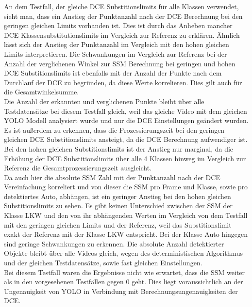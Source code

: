 {{		An dem Testfall, der gleiche DCE Substitionslimits für alle Klassen verwendet, sieht man, dass ein Anstieg der Punktanzahl nach der DCE Berechnung bei den geringen gleichen Limits vorhanden ist. Dies ist durch das Anheben mancher DCE Klassensubstitutionslimits im Vergleich zur Referenz zu erklären. Ähnlich lässt sich der Anstieg der Punktanzahl im Vergleich mit den hohen gleichen Limits interpretieren. Die Schwankungen im Vergleich zur Referenz bei der Anzahl der verglichenen Winkel zur SSM Berechnung bei geringen und hohen DCE Substitionslimits ist ebenfalls mit der Anzahl der Punkte nach dem Durchlauf der DCE zu begründen, da diese Werte korrelieren. Dies gilt auch für die Gesamtwinkelsumme. \\
		Die Anzahl der erkannten und verglichenen Punkte bleibt über alle Testdatensätze bei diesem Testfall gleich, weil das gleiche Video mit dem gleichen YOLO Modell analysiert wurde und nur die DCE Einstellungen geändert wurden. Es ist außerdem zu erkennen, dass die Prozessierungszeit bei den geringen gleichen DCE Substitionslimits ansteigt, da die DCE Berechnung aufwendiger ist. Bei den hohen gleichen Substitionslimits ist der Anstieg nur marginal, da die Erhöhung der DCE Substitionslimits über alle 4 Klassen hinweg im Vergleich zur Referenz die Gesamtprozessierungszeit ausgleicht. \\
		Da auch hier die absolute SSM Zahl mit der Punktanzahl nach der DCE Vereinfachung korreliert und von dieser die SSM pro Frame und Klasse, sowie pro detektiertes Auto, abhängen, ist ein geringer Anstieg bei den hohen gleichen Substitionslimits zu sehen. Es gibt keinen Unterschied zwischen der SSM der Klasse LKW und den von ihr abhängenden Werten im Vergleich von dem Testfall mit den geringen gleichen Limits und der Referenz, weil das Substitionslimit exakt der Referenz mit der Klasse LKW entspricht. Bei der Klasse Auto hingegen sind geringe Schwankungen zu erkennen. Die absolute Anzahl detektierter Objekte bleibt über alle Videos gleich, wegen des deterministischen Algorithmus und der gleichen Testdatensätze, sowie fast gleichen Einstellungen. \\
		Bei diesem Testfall waren die Ergebnisse nicht wie erwartet, dass die SSM weiter als in den vorgesehenen Testfällen gegen 0 geht. Dies liegt voraussichtlich an der Ungenauigkeit von YOLO in Verbindung mit Berechnungsungenauigkeiten der DCE. \\

}}
